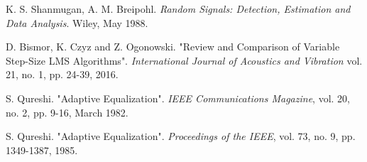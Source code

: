 \documentclass[main.tex]{subfiles}
\begin{document}
\begin{thebibliography}{00}
    K. S. Shanmugan, A. M. Breipohl.
    \textit{Random Signals: Detection, Estimation and Data Analysis}.
    Wiley, May 1988.

    D. Bismor, K. Czyz and Z. Ogonowski. "Review and Comparison of Variable Step-Size LMS Algorithms". 
    \textit{International Journal of Acoustics and Vibration} vol. 21, no. 1, pp. 24-39, 2016.

    S. Qureshi. "Adaptive Equalization".
    \textit{IEEE Communications Magazine}, vol. 20, no. 2, pp. 9-16, March 1982.

    S. Qureshi. "Adaptive Equalization".
    \textit{Proceedings of the IEEE}, vol. 73, no. 9, pp. 1349-1387, 1985.
    
\end{thebibliography}
\end{document}
